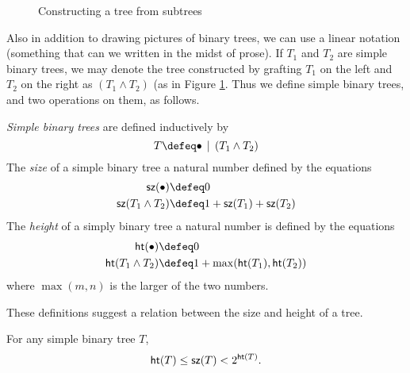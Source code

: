 {\begin{figure}[h]
  \centering
{}

  \caption{Constructing a tree from subtrees}
  \label{fig:BinTreeConstruction}
\end{figure}
Also in addition to drawing pictures of binary trees, we can use a linear notation (something that  can we written 
in the midst of prose). 
If $T_1$ and $T_2$ are simple binary trees, we may denote the tree constructed by grafting $T_1$ on the left and $T_2$ on the right
as $(T_1\wedge T_2)$ (as in Figure \ref{fig:BinTreeConstruction}. Thus we define simple binary trees, and two operations
on them, as follows.

\begin{defn}
\emph{Simple binary trees} are defined inductively by
\[T \defeq \bullet \,\mid\, (T_1\wedge T_2)\]
The \emph{size} of a simple binary tree a natural number defined by the equations
\begin{align*}
  \sz(\bullet) &\defeq 0\\
  \sz(T_1\wedge T_2) &\defeq 1 + \sz(T_1) + \sz(T_2)
\end{align*}
The \emph{height} of a simply binary tree a natural number is defined
by the equations
\begin{align*}
  \hght(\bullet) &\defeq 0\\
  \hght(T_1\wedge T_2) &\defeq 1 + \max(\hght(T_1),\hght(T_2))
\end{align*}
where $\max(m,n)$ is the larger of the two numbers.
\end{defn}

These definitions suggest a relation between the size and height of a tree.
\ipadbreak

\begin{lemma}
For any simple binary tree $T$,  \[\mathord{\textsf{ht}}(T)\leq \mathord{\textsf{sz}}(T) < 2^{\mathord{\textsf{ht}}(T)}.\]


\end{lemma}}
